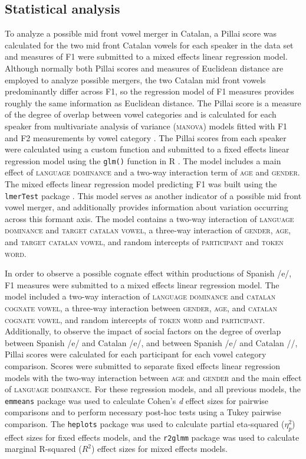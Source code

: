 \documentclass[output=paper,colorlinks,citecolor=brown,draftmode]{langscibook}
\begin{document}
\subsection{Statistical analysis}

    To analyze a possible mid front vowel merger in Catalan, a Pillai score was calculated for the two mid front Catalan vowels for each speaker in the data set and measures of F1 were submitted to a mixed effects linear regression model. Although normally both Pillai scores and measures of Euclidean distance are employed to analyze possible mergers, the two Catalan mid front vowels predominantly differ across F1, so the regression model of F1 measures provides roughly the same information as Euclidean distance. The Pillai score is a measure of the degree of overlap between vowel categories and is calculated for each speaker from multivariate analysis of variance (\textsc{manova}) models fitted with F1 and F2 measurements by vowel category \citep{nycz2013best}. The Pillai scores from each speaker were calculated using a custom function and submitted to a fixed effects linear regression model using the \texttt{glm()} function in R \citep{R}. The model includes a main effect of \textsc{language dominance} and a two-way interaction term of \textsc{age} and \textsc{gender}. The mixed effects linear regression model predicting F1 was built using the \texttt{lmerTest} package \citep{lmertest}. This model serves as another indicator of a possible mid front vowel merger, and additionally provides information about variation occurring across this formant axis. The model contains a two-way interaction of \textsc{language dominance} and \textsc{target catalan vowel}, a three-way interaction of \textsc{gender}, \textsc{age}, and \textsc{target catalan vowel}, and random intercepts of \textsc{participant} and \textsc{token word}.

    In order to observe a possible cognate effect within productions of Spanish /e/, F1 measures were submitted to a mixed effects linear regression model. The model included a two-way interaction of \textsc{language dominance} and \textsc{catalan cognate vowel}, a three-way interaction between \textsc{gender}, \textsc{age}, and \textsc{catalan cognate vowel}, and random intercepts of \textsc{token word} and \textsc{participant}. Additionally, to observe the impact of social factors on the degree of overlap between Spanish /e/ and Catalan /e/, and between Spanish /e/ and Catalan /\textepsilon/, Pillai scores were calculated for each participant for each vowel category comparison. Scores were submitted to separate fixed effects linear regression models with the two-way interaction between \textsc{age} and \textsc{gender} and the main effect of \textsc{language dominance}. For these regression models, and all previous models, the \texttt{emmeans} package \citep{emmeans} was used to calculate Cohen's \emph{d} effect sizes for pairwise comparisons and to perform necessary post-hoc tests using a Tukey pairwise comparison. The \texttt{heplots} package \citep{heplots} was used to calculate partial eta-squared ($\eta_{p}^{2}$) effect sizes for fixed effects models, and the \texttt{r2glmm} package \citep{r2glmm} was used to calculate marginal R-squared ($R^{2}$) effect sizes for mixed effects models.
\end{document}
